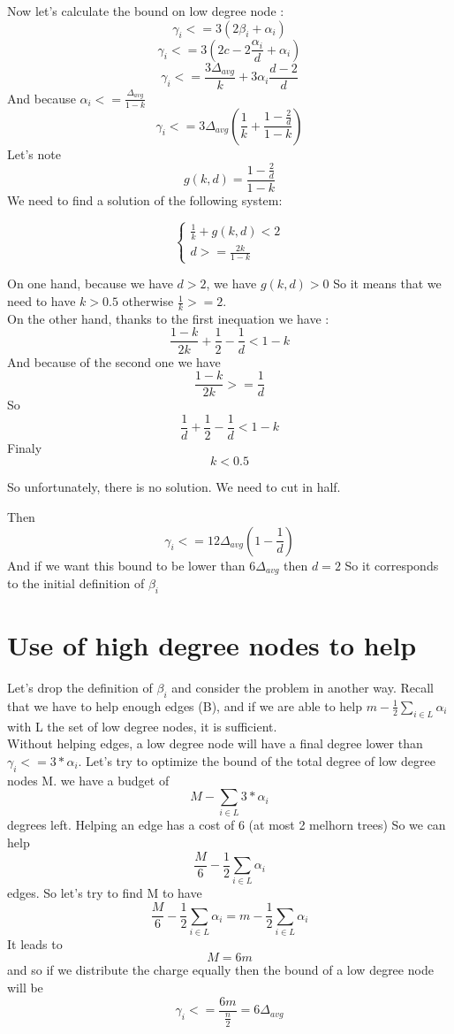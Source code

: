 \documentclass{article}
\begin{document}
Now let's calculate the bound on low degree node :
$$\gamma_i <= 3(2\beta_i+\alpha_i)$$
$$\gamma_i <= 3(2c - 2\frac{\alpha_i}{d} + \alpha_i)$$
$$\gamma_i <= \frac{3\Delta_{avg}}{k} + 3\alpha_i\frac{d-2}{d}$$
And because $\alpha_i <= \frac{\Delta_{avg}}{1-k}$
$$\gamma_i <= 3\Delta_{avg}\left(\frac{1}{k}+\frac{1-\frac{2}{d}}{1-k}\right)$$
Let's note $$g(k,d) = \frac{1-\frac{2}{d}}{1-k}$$
We need to find a solution of the following system:

\begin{equation*}
\begin{cases}
  \frac{1}{k} + g(k,d) < 2\\
  d >= \frac{2k}{1-k}
\end{cases}
\end{equation*}

On one hand, because we have $d > 2$, we have $g(k, d) > 0$ So it means that we need
to have $k > 0.5$ otherwise $\frac{1}{k} >= 2$.\\

On the other hand, thanks to the first inequation we have :
$$\frac{1-k}{2k} + \frac{1}{2} - \frac{1}{d} < 1-k$$
And because of the second one we have 
$$\frac{1-k}{2k} >= \frac{1}{d}$$
So $$\frac{1}{d} + \frac{1}{2} - \frac{1}{d} < 1 - k$$
Finaly $$k < 0.5$$

So unfortunately, there is no solution. We need to cut in half.

Then $$\gamma_i <= 12\Delta_{avg}\left(1-\frac{1}{d}\right)$$
And if we want this bound to be lower than $6\Delta_{avg}$ then $d = 2$
So it corresponds to the initial definition of $\beta_i$ 

\newpage

\section{Use of high degree nodes to help}

Let's drop the definition of $\beta_i$ and consider the problem in another
way. Recall that we have to help enough edges (B), and if we are able to help
$m - \frac{1}{2}\sum_{i \in L}\alpha_i$ with L the set of low degree nodes,
it is sufficient.\\

Without helping edges, a low degree node will have a final degree lower
than $\gamma_i <= 3*\alpha_i$. Let's try to optimize the bound of the
total degree of low degree nodes M. we have a budget of
$$M - \sum_{i \in L}3*\alpha_i$$
degrees left.
Helping an edge has a cost of 6 (at most 2 melhorn trees)
So we can help $$\frac{M}{6} - \frac{1}{2}\sum_{i \in L}\alpha_i$$
edges.
So let's try to find M to have
$$\frac{M}{6} - \frac{1}{2}\sum_{i \in L}\alpha_i = m - \frac{1}{2}\sum_{i \in L}\alpha_i$$
It leads to
$$M = 6m$$
and so if we distribute the charge equally then the bound of a low degree node
will be $$\gamma_i <= \frac{6m}{\frac{n}{2}} = 6\Delta_{avg}$$
\end{document}
